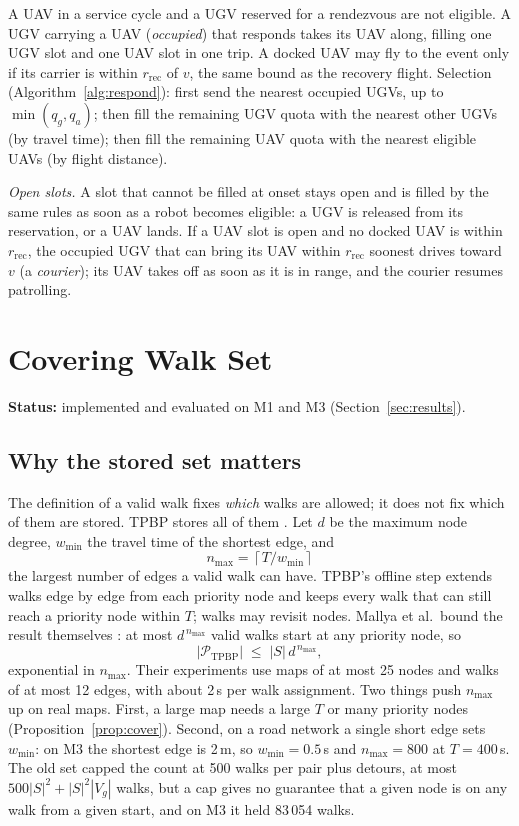 \documentclass[11pt]{article}
\theoremstyle{definition}
\theoremstyle{plain}
\begin{document}
A UAV in a service cycle and a UGV reserved for a rendezvous are not
eligible. A UGV carrying a UAV (\emph{occupied}) that responds takes its
UAV along, filling one UGV slot and one UAV slot in one trip. A docked UAV
may fly to the event only if its carrier is within $r_{\mathrm{rec}}$ of
$v$, the same bound as the recovery flight. Selection
(Algorithm~\ref{alg:respond}): first send the nearest occupied UGVs, up to
$\min(q_g, q_a)$; then fill the remaining UGV quota with the nearest other
UGVs (by travel time); then fill the remaining UAV quota with the nearest
eligible UAVs (by flight distance).

\emph{Open slots.} A slot that cannot be filled at onset stays open and is
filled by the same rules as soon as a robot becomes eligible: a UGV is
released from its reservation, or a UAV lands. If a UAV slot is open and no
docked UAV is within $r_{\mathrm{rec}}$, the occupied UGV that can bring
its UAV within $r_{\mathrm{rec}}$ soonest drives toward $v$ (a
\emph{courier}); its UAV takes off as soon as it is in range, and the
courier resumes patrolling.

\section{Covering Walk Set}
\label{sec:cover}

\textbf{Status:} implemented and evaluated on M1 and M3 (Section~\ref{sec:results}).

\subsection{Why the stored set matters}

The definition of a valid walk fixes \emph{which} walks are allowed; it
does not fix which of them are stored. TPBP stores all of them
\cite{mallya2021}. Let $d$ be the maximum node degree, $w_{\min}$ the
travel time of the shortest edge, and
\begin{equation}
n_{\max} = \left\lceil T / w_{\min} \right\rceil
\end{equation}
the largest number of edges a valid walk can have. TPBP's offline step
extends walks edge by edge from each priority node and keeps every walk
that can still reach a priority node within $T$; walks may revisit nodes.
Mallya et al.\ bound the result themselves \cite{mallya2021}: at most
$d^{\,n_{\max}}$ valid walks start at any priority node, so
\begin{equation}
|\mathcal{P}_{\mathrm{TPBP}}| \;\leq\; |S|\, d^{\,n_{\max}} ,
\end{equation}
exponential in $n_{\max}$. Their experiments use maps of at most 25 nodes
and walks of at most 12 edges, with about 2\,s per walk assignment. Two
things push $n_{\max}$ up on real maps. First, a large map needs a large
$T$ or many priority nodes (Proposition~\ref{prop:cover}). Second, on a
road network a single short edge sets $w_{\min}$: on M3 the shortest edge
is 2\,m, so $w_{\min} = 0.5$\,s and $n_{\max} = 800$ at $T = 400$\,s.
The old set capped the count at 500 walks per pair plus detours, at most
$500|S|^2 + |S|^2|V_g|$ walks, but a cap gives no guarantee that a given
node is on any walk from a given start, and on M3 it held 83\,054 walks.
\end{document}
